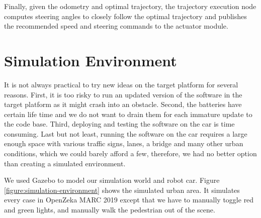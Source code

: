 Finally, given the odometry and optimal trajectory, the trajectory execution
node computes steering angles to closely follow the optimal trajectory and
publishes the recommended speed and steering commands to the actuator module.

\section{Simulation Environment}

It is not always practical to try new ideas on the target platform for several
reasons. First, it is too risky to run an updated version of the software in
the target platform as it might crash into an obstacle. Second, the batteries
have certain life time and we do not want to drain them for each immature
update to the code base. Third, deploying and testing the software on the car
is time consuming. Last but not least, running the software on the car requires
a large enough space with various traffic signs, lanes, a bridge and many other
urban conditions, which we could barely afford a few, therefore, we had no
better option than creating a simulated environment.

We used Gazebo to model our simulation world and robot car. Figure
\ref{figure:simulation-environment} shows the simulated urban area. It
simulates every case in OpenZeka MARC 2019 except that we have to manually
toggle red and green lights, and manually walk the pedestrian out of the scene.

